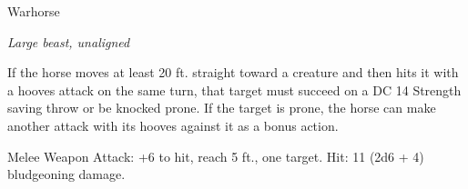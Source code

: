 \begin{monsterbox}{Warhorse}
\begin{hangingpar}
\textit{Large beast, unaligned}
\end{hangingpar}
\dndline%
\basics[%
armorclass = 11,
hitpoints = 3d10 + 3,
speed = {60 ft.}
]
\dndline%
\stats[%
STR = \stat{18},
DEX = \stat{12},
CON = \stat{13},
INT = \stat{2},
WIS = \stat{12},
CHA = \stat{7}
]
\dndline%
\details[%
skills={},
damageimmunities={},
savingthrows={},
conditionimmunities={},
damageresistances={},
damagevulnerabilities={},
senses={passive Perception 11},
challenge=1/2
]
\dndline%
\begin{monsteraction}
If the horse moves at least 20 ft. straight toward a creature and then hits it with a hooves attack on the same turn, that target must succeed on a DC 14 Strength saving throw or be knocked prone. If the target is prone, the horse can make another attack with its hooves against it as a bonus action.
\end{monsteraction}
\begin{monsteraction}[Hooves]
Melee Weapon Attack: +6 to hit, reach 5 ft., one target. Hit: 11 (2d6 + 4) bludgeoning damage.
\end{monsteraction}
\end{monsterbox}